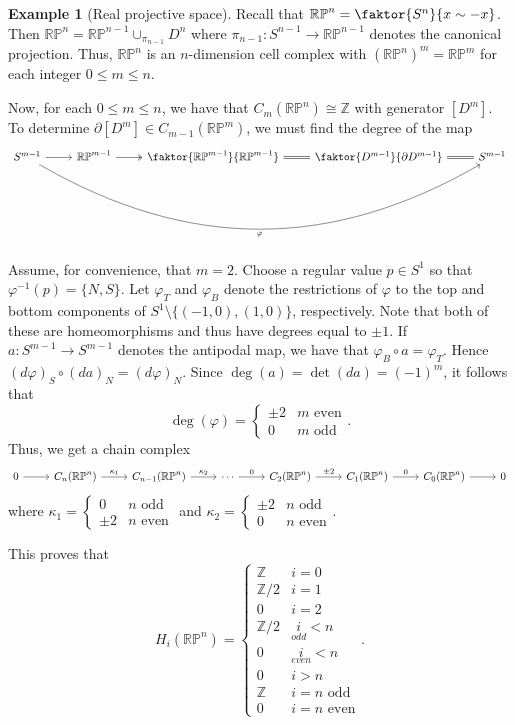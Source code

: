 \documentclass[10pt,letterpaper,cm]{nupset}
\theoremstyle{definition}
\newtheorem{exmp}[defn]{Example}
\theoremstyle{theorem}
\theoremstyle{remark}
\newcommand{\RP}{\mathbb{RP}}
\newcommand{\Z}{\mathbb Z}
\newcommand{\1}{\mathbb{1}}
\newcommand{\0}{\vec 0}
\begin{document}
\begin{exmp}[Real projective space]
Recall that $\RP^n = \faktor{S^n}{x \sim {-}x}$. Then $\RP^n = \RP^{n-1} \cup_{\pi_{n-1}} D^n$ where $\pi_{n-1} : S^{n-1} \to \RP^{n-1}$ denotes the canonical projection. Thus, $\RP^n$ is an $n$-dimension cell complex with $(\RP^n)^m = \RP^m$ for each integer $0\leq m\leq n$.

\medskip

Now, for each $0\leq m \leq n$, we have that $C_m(\RP^n) \cong \Z$ with generator $[D^m]$. To determine $\partial[D^m]\in C_{m-1}(\RP^m)$, we must find the degree of the map
\[
\begin{tikzcd}
S^{m-1} \arrow[rrrr, "\varphi"', bend right] \arrow[r] & \RP^{m-1} \arrow[r, two heads] & \faktor{\RP^{m-1}}{\RP^{m-1}} \arrow[r, equals] & \faktor{D^{m-1}}{\partial{D^{m-1}}} \arrow[r, equals] & S^{m-1}
\end{tikzcd}
\]
Assume, for convenience, that $m=2$. Choose a regular value $p\in S^{1}$ so that $\varphi^{-1}(p) = \{N, S\}$. Let $\varphi_T$ and $\varphi_B$ denote the restrictions of $\varphi$ to the top and bottom components of $S^1 \setminus \{({-}1, 0), (1,0)\}$, respectively. Note that both of these are homeomorphisms and thus have degrees equal to $\pm 1$. If $a: S^{m-1} \to S^{m-1}$ denotes the antipodal map, we have that $\varphi_B \circ a= \varphi_T$. Hence $(d{\varphi})_S \circ (d{a})_N = (d{\varphi})_N$.  Since $\deg(a) = \det(d{a}) = ({-}1)^m$, it follows that $$\deg(\varphi) = \begin{cases} \pm 2 & m  \text{ even} \\ 0 & m \text{ odd} \end{cases}.$$
Thus, we get a chain complex
\[
\begin{tikzcd}
0 \arrow[r] & C_n(\RP^n) \arrow[r, "\kappa_1"] & C_{n-1}(\RP^n) \arrow[r, "\kappa_2"] & \cdots \arrow[r, "0"] & C_2(\RP^n) \arrow[r, "\pm 2"] & C_1(\RP^n) \arrow[r, "0"] & C_0(\RP^n) \arrow[r] & 0
\end{tikzcd}
\] where $\kappa_1 = \begin{cases} 0 & n \text{ odd} \\ \pm 2 & n \text{ even} \end{cases}$ and $\kappa_2 = \begin{cases} \pm 2 & n \text{ odd} \\ 0 & n \text{ even} \end{cases}$.

This proves that $$ H_i( \RP^n) = \begin{cases} \Z & i =0 \\ \Z/2 & i =1 \\ 0 & i =2 \\ \Z/2 & \underset{odd}{i} <n \\ 0 & \underset{even}{i} <n \\ 0 & i >n \\ \Z & i =n \text{ odd} \\ 0 & i= n \text{ even}    \end{cases}  .$$
\end{exmp}
\end{document}

